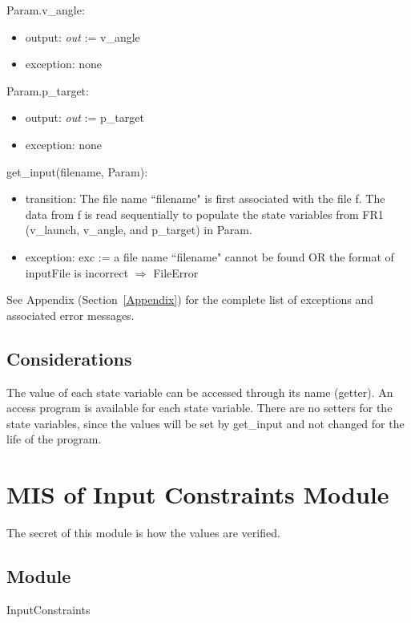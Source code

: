 \documentclass[12pt, titlepage]{article}
\begin{document}
\noindent Param.v\_angle:
\begin{itemize}
\item output: \textit{out} := v\_angle
\item exception: none
\end{itemize}

\noindent Param.p\_target:
\begin{itemize}
\item output: \textit{out} := p\_target
\item exception: none
\end{itemize}

\noindent get\_input(filename, Param):
\begin{itemize}
\item transition: The file name ``filename" is first associated with the file f. 
The data from f is read sequentially to populate the state variables from
FR1 (v\_launch, v\_angle, and p\_target) in Param.
\item exception: exc := a file name ``filename" cannot be found OR the format of
inputFile is incorrect $\Rightarrow$  FileError
\end{itemize}

See Appendix (Section~\ref{Appendix}) for the complete list of exceptions and 
associated error messages.

\subsection{Considerations}

The value of each state variable can be accessed through its name (getter).  An
access program is available for each state variable.  There are no setters for
the state variables, since the values will be set by get\_input and
not changed for the life of the program.

\newpage

\section{MIS of Input Constraints Module} \label{VerifyInput}

The secret of this module is how the values are verified.

\subsection{Module}

InputConstraints
\end{document}
